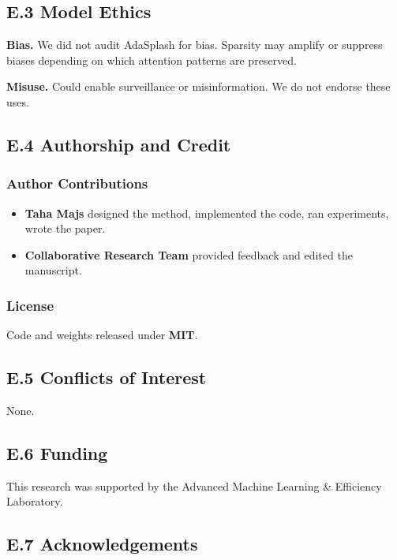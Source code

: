 \subsection{E.3 Model Ethics}

\textbf{Bias.} We did not audit AdaSplash for bias. Sparsity may amplify or suppress 
biases depending on which attention patterns are preserved.

\textbf{Misuse.} Could enable surveillance or misinformation. We do not endorse 
these uses.

\subsection{E.4 Authorship and Credit}

\subsubsection{Author Contributions}

\begin{itemize}
\item \textbf{Taha Majs} designed the method, implemented the code, ran experiments,
  wrote the paper.
\item \textbf{Collaborative Research Team} provided feedback and edited the manuscript.

\end{itemize}
\subsubsection{License}

Code and weights released under \textbf{MIT}.

\subsection{E.5 Conflicts of Interest}

None.

\subsection{E.6 Funding}

This research was supported by the Advanced Machine Learning \& Efficiency Laboratory.

\subsection{E.7 Acknowledgements}

